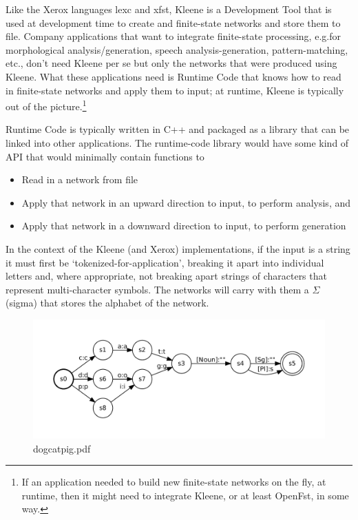\documentclass[letterpaper,12pt]{article}
\begin{document}
Like the Xerox languages lexc and xfst, Kleene is a Development Tool that is used at development
time to create and finite-state networks and store them to file.  Company applications that want to integrate
finite-state processing, e.g.\@ for morphological analysis/generation, speech analysis-generation, pattern-matching, etc., don't need Kleene per se but only the networks that were produced using
Kleene.  What these applications need is Runtime Code that knows how to read in finite-state networks
and apply them to input; at runtime, Kleene is typically out of the picture.\footnote{If an application
needed to build new finite-state networks on the fly, at runtime, then it might need to integrate
Kleene, or at least OpenFst, in some way.}

Runtime Code is typically written in C++ and packaged as a library that can be linked into other
applications.  The runtime-code library would have some kind of API that would minimally contain functions to

\begin{itemize}
\item
Read in a network from file
\item
Apply that network in an upward direction to input, to perform analysis, and 
\item
Apply that network in a downward direction to input, to perform generation
\end{itemize}

\noindent
In the context of the Kleene (and Xerox) implementations, if the input is a string it must first be
`tokenized-for-application', breaking it apart into individual letters and, where appropriate, not
breaking apart strings of characters that represent multi-character symbols.  The networks will carry
with them a $\Sigma$ (sigma) that stores the alphabet of the network.

\begin{figure}
\includegraphics[width=15cm]{images/dogcatpig}
\caption{dogcatpig.pdf}
\label{fig:dogcatpig2}
\end{figure}
\end{document}
